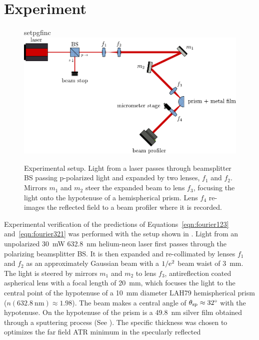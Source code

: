 \section{Experiment}\label{sec:intexperimental}
\begin{figure}[ht]
\centering
{setpgfinc}
\includegraphics[keepaspectratio,width=14cm]{interference/figures/opticalsetup.pdf}
\caption{Experimental setup.  Light from a laser passes through beamsplitter
BS passing p-polarized light and expanded by two lenses, $f_1$ and $f_2$.
Mirrors $m_1$ and $m_2$ steer the expanded beam to lens $f_3$, focusing the
light onto the hypotenuse of a hemispherical prism.  Lens $f_4$ re-images the reflected field to a beam profiler where it is recorded.}
\label{fig:opticalsetup}
\end{figure}
Experimental verification of the predictions of Equations~\ref{eqn:fourier123}
and~\ref{eqn:fourier321} was performed with the setup shown in
.  Light from an
unpolarized \SI{30}{\milli\watt} \SI{632.8}{\nano\meter} helium-neon
laser first passes through the polarizing
beamsplitter BS\@.  It is then expanded and re-collimated by lenses $f_1$ and $f_2$ as an
approximately Gaussian beam with a $1/{\mathrm{e}}^2$ beam waist of
\SI{3}{\milli\meter}. The light is steered by mirrors $m_1$ and $m_2$ to
lens $f_3$, antireflection coated aspherical lens with a focal length of
\SI{20}{\milli\meter}, which
focuses the light to the central point of the hypotenuse of a
\SI{10}{\milli\meter} diameter LAH79 hemispherical prism
($n(\SI{632.8}{\nano\meter})\approx1.98$).  The beam makes a central angle
of $\theta_\mathrm{sp}\approx\SI{32}{\degree}$ with the hypotenuse.
On the hypotenuse of the prism is a \SI{49.8}{\nano\meter} silver film
obtained through a sputtering process (See ).
The specific thickness was chosen to
optimizes the far field ATR minimum in the specularly reflected
